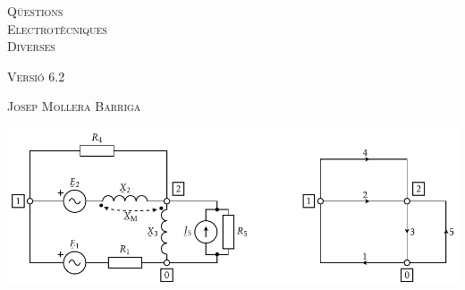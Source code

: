 \begin{titlepage}

   \parbox{18cm}{\fontsize{60pt}{60pt}\selectfont\color{NavyBlue}\scshape%
                 Q\"{u}estions\\[30pt] Electrot\`{e}cniques\\[30pt] Diverses}

   \vspace*{1.8cm}
   {\fontsize{30pt}{30pt}\selectfont\textsc{Versi\'{o} 6.2}}

   \vspace*{2cm}
   {\fontsize{40pt}{40pt}\selectfont\textsc{Josep Mollera Barriga}}

   \vspace*{3cm}
   \includegraphics{Imatges/Cap-ResXarxElec-Circuit-Graf.pdf}

\end{titlepage}
